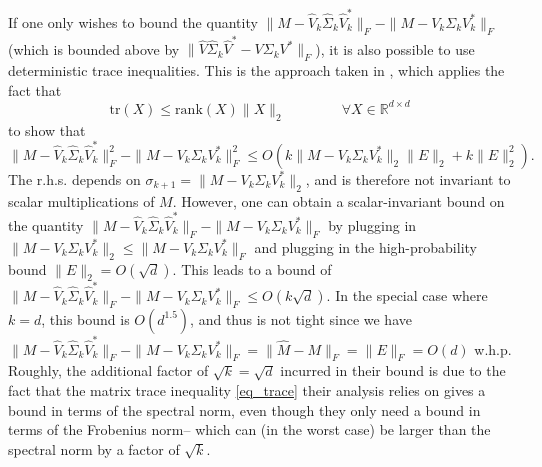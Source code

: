 \documentclass[11pt,letterpaper]{article}
\begin{document}
\noindent
If one only wishes to bound the quantity  $\|M- \hat{V}_k \hat{\Sigma}_k \hat{V}_k^\ast\|_F - \|M- V_k \Sigma_k V_k^\ast\|_F$ (which is bounded above by $\|\hat{V} \hat{\Sigma}_k \hat{V}^\ast - V \Sigma_k V^\ast\|_F$), 
%
it is also possible to use deterministic trace inequalities. 
%
This is the approach taken in \cite{dwork2014analyze}, which applies the fact that 
%
\begin{equation} \label{eq_trace}
\mathrm{tr}(X) \leq \mathrm{rank}(X)\|X\|_2 \qquad \qquad \forall X \in \mathbb{R}^{d \times d}
\end{equation}
 to show that $$\|M- \hat{V}_k \hat{\Sigma}_k \hat{V}_k^\ast\|_F^2 - \|M- V_k \Sigma_k V_k^\ast\|_F^2 \leq O(k \|M - V_k \Sigma_k V_k^\ast\|_2 \|E\|_2 + k \|E\|_2^2).$$
%
The r.h.s. depends on $\sigma_{k+1} = \|M - V_k \Sigma_k V_k^\ast\|_2$, and is therefore not invariant to scalar multiplications of $M$.
%
However, one can obtain a scalar-invariant bound on the quantity $\|M- \hat{V}_k \hat{\Sigma}_k \hat{V}_k^\ast\|_F - \|M- V_k \Sigma_k V_k^\ast\|_F$ by plugging in $\|M - V_k \Sigma_k V_k^\ast\|_2 \leq \|M - V_k \Sigma_k V_k^\ast\|_F$ and plugging in the high-probability bound  $\|E\|_2 = O(\sqrt{d})$.
%
This leads to a bound of $\|M- \hat{V}_k \hat{\Sigma}_k \hat{V}_k^\ast\|_F - \|M- V_k \Sigma_k V_k^\ast\|_F \leq O(k \sqrt{d})$.
%
In the special case where $k=d$, this bound is $O(d^{1.5})$, and thus is not tight since we have $\|M- \hat{V}_k \hat{\Sigma}_k \hat{V}_k^\ast\|_F - \|M- V_k \Sigma_k V_k^\ast\|_F = \|\hat{M} - M \|_F = \|E\|_F = O(d)$ w.h.p.
%
Roughly, the additional factor of $\sqrt{k} = \sqrt{d}$ incurred in their bound is due to the fact that the matrix trace inequality \eqref{eq_trace} their analysis relies on gives a bound in terms of the spectral norm, even though they only need a bound in terms of the Frobenius norm-- which can (in the worst case) be larger than the spectral norm by a factor of $\sqrt{k}$.
\end{document}
